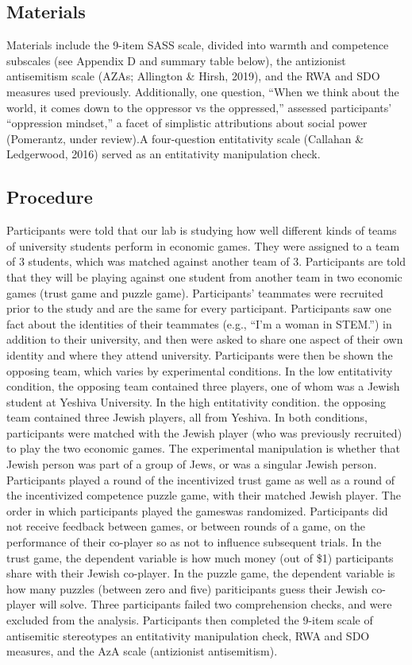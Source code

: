 \documentclass[
  doc,draftall]{apa6}
\begin{document}
\subsection{Materials}\label{materials}

Materials include the 9-item SASS scale, divided into warmth and competence subscales (see Appendix D and summary table below), the antizionist antisemitism scale (AZAs; Allington \& Hirsh, 2019), and the RWA and SDO measures used previously. Additionally, one question, ``When we think about the world, it comes down to the oppressor vs the oppressed,'' assessed participants' ``oppression mindset,'' a facet of simplistic attributions about social power (Pomerantz, under review).A four-question entitativity scale (Callahan \& Ledgerwood, 2016) served as an entitativity manipulation check.

\subsection{Procedure}\label{procedure}

Participants were told that our lab is studying how well different kinds of teams of university students perform in economic games. They were assigned to a team of 3 students, which was matched against another team of 3. Participants are told that they will be playing against one student from another team in two economic games (trust game and puzzle game).
Participants' teammates were recruited prior to the study and are the same for every participant. Participants saw one fact about the identities of their teammates (e.g., ``I'm a woman in STEM.'') in addition to their university, and then were asked to share one aspect of their own identity and where they attend university.
Participants were then be shown the opposing team, which varies by experimental conditions. In the low entitativity condition, the opposing team contained three players, one of whom was a Jewish student at Yeshiva University. In the high entitativity condition. the opposing team contained three Jewish players, all from Yeshiva. In both conditions, participants were matched with the Jewish player (who was previously recruited) to play the two economic games. The experimental manipulation is whether that Jewish person was part of a group of Jews, or was a singular Jewish person.
Participants played a round of the incentivized trust game as well as a round of the incentivized competence puzzle game, with their matched Jewish player. The order in which participants played the gameswas randomized. Participants did not receive feedback between games, or between rounds of a game, on the performance of their co-player so as not to influence subsequent trials. In the trust game, the dependent variable is how much money (out of \$1) participants share with their Jewish co-player. In the puzzle game, the dependent variable is how many puzzles (between zero and five) pariticipants guess their Jewish co-player will solve. Three participants failed two comprehension checks, and were excluded from the analysis.
Participants then completed the 9-item scale of antisemitic stereotypes an entitativity manipulation check, RWA and SDO measures, and the AzA scale (antizionist antisemitism).
\end{document}

